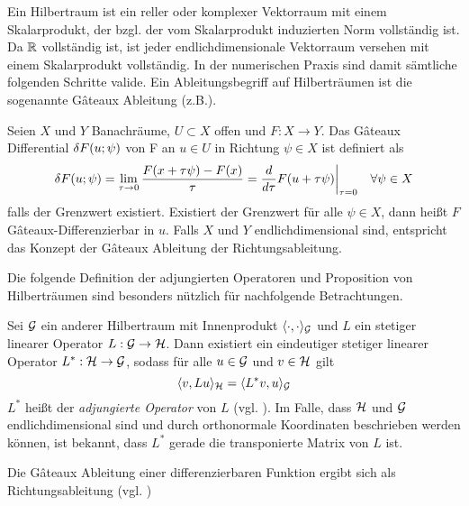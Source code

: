 Ein Hilbertraum ist ein reller oder komplexer Vektorraum mit einem Skalarprodukt, der bzgl. der vom Skalarprodukt induzierten Norm vollständig ist. Da $\mathbb{R}$ vollständig ist, ist jeder endlichdimensionale Vektorraum versehen mit einem Skalarprodukt vollständig. In der numerischen Praxis sind damit sämtliche folgenden Schritte valide. 
Ein Ableitungsbegriff auf Hilberträumen ist die sogenannte Gâteaux Ableitung (z.B.\cite[]{lindenstrauss2003frechet}).
\begin{definition}
 Seien $X$ und $Y$ Banachräume, $U \subset X$ offen und $F:X\to Y$. Das Gâteaux Differential $\delta F(u;\psi)$ von F an $u\in U$ in Richtung $\psi\in X$ ist definiert als
 \[
  \delta F(u;\psi) = \lim_{\tau \to 0} \frac{F(x+\tau \psi) - F(x)}{\tau} = \frac{d}{d\tau} F(u+\tau\psi)\biggr\rvert_{\tau = 0}\quad \forall \psi \in X
 \]
 falls der Grenzwert existiert. Existiert der Grenzwert für alle $\psi\in X$, dann heißt $F$ Gâteaux-Differenzierbar in $u$.
 Falls $X$ und $Y$ endlichdimensional sind, entspricht das Konzept der Gâteaux Ableitung der Richtungsableitung.
\end{definition}
Die folgende Definition der adjungierten Operatoren und Proposition von Hilberträumen sind besonders nützlich für nachfolgende Betrachtungen.
\begin{definition}
Sei $\mathcal{G}$ ein anderer Hilbertraum mit Innenprodukt $\langle \cdot,\cdot \rangle_{\mathcal{G}}$ und $L$ ein stetiger linearer Operator $L:\mathcal{G}\to \mathcal{H}$. Dann existiert ein eindeutiger stetiger linearer Operator $L^*:\mathcal{H}\to\mathcal{G}$, sodass für alle $u\in \mathcal{G}$ und $v\in \mathcal{H}$ gilt
\begin{equation}
\label{eq:adjointInnerProduct}
\langle v,Lu\rangle_{\mathcal{H}} =  \langle L^*v,u \rangle_{\mathcal{G}}
\end{equation}
$L^*$ heißt der \textit{adjungierte Operator} von $L$ (vgl. \cite[Definition V.5.1]{werner2007funktionalanalysis}). Im Falle, dass $\mathcal{H}$ und $\mathcal{G}$ endlichdimensional sind und durch orthonormale Koordinaten beschrieben werden können, ist bekannt, dass  $L^*$ gerade die transponierte Matrix von $L$ ist.
\end{definition}
Die Gâteaux Ableitung einer differenzierbaren Funktion ergibt sich als Richtungsableitung (vgl. \cite[Example 9.2.4]{debnath2005hilbert})
